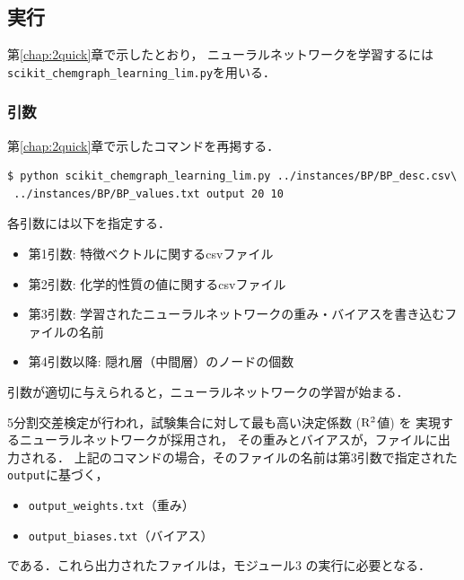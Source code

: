 \documentclass[11pt,titlepage,dvipdfmx,twoside]{jsbook}
\newcommand{\chapref}[1]{第\ref{chap:#1}章}
\begin{document}
\subsection{実行}
\chapref{2quick}で示したとおり，
ニューラルネットワークを学習するには{\tt scikit\_chemgraph\_learning\_lim.py}を用いる．

\subsubsection{引数}
\chapref{2quick}で示したコマンドを再掲する．
\begin{oframed}
  {\small  
\begin{verbatim}
$ python scikit_chemgraph_learning_lim.py ../instances/BP/BP_desc.csv\
 ../instances/BP/BP_values.txt output 20 10
\end{verbatim}
}
\end{oframed}
各引数には以下を指定する．
\begin{itemize}
\item 第1引数: 特徴ベクトルに関するcsvファイル
\item 第2引数: 化学的性質の値に関するcsvファイル
\item 第3引数: 学習されたニューラルネットワークの重み・バイアスを書き込むファイルの名前
\item 第4引数以降: 隠れ層（中間層）のノードの個数
\end{itemize}


引数が適切に与えられると，ニューラルネットワークの学習が始まる．

5分割交差検定が行われ，試験集合に対して最も高い決定係数 (${\rm R}^2$値) を
実現するニューラルネットワークが採用され，
その重みとバイアスが，ファイルに出力される．
上記のコマンドの場合，そのファイルの名前は第3引数で指定された\verb|output|に基づく，
\begin{itemize}
\item \verb|output_weights.txt|（重み）
\item \verb|output_biases.txt|（バイアス）
\end{itemize}
である．これら出力されたファイルは，モジュール3 の実行に必要となる．
\end{document}
